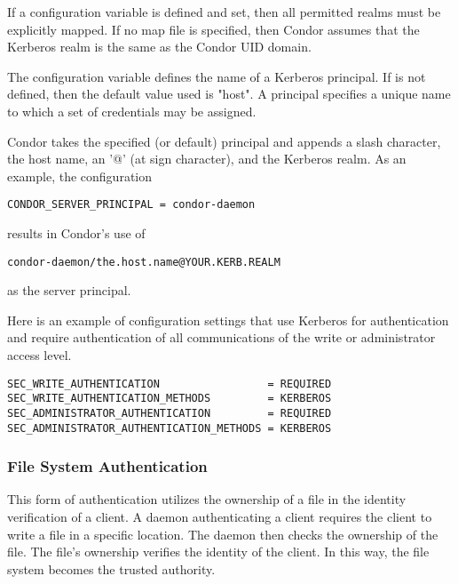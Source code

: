 If a 
configuration variable is defined and set,
then all permitted realms must be explicitly mapped.
If no map file is specified, then Condor assumes that the
Kerberos realm is the same as the Condor UID domain.

The configuration variable
defines the name of a Kerberos principal.
If  is not defined,
then the default value used is "host".
A principal specifies a unique name to which a set of credentials
may be assigned.

Condor takes the specified (or default) principal and appends
a slash character, the host name, an '@' (at sign character),
and the Kerberos realm.
As an example, the configuration
\begin{verbatim}
CONDOR_SERVER_PRINCIPAL = condor-daemon
\end{verbatim}
results in Condor's use of
\begin{verbatim}
condor-daemon/the.host.name@YOUR.KERB.REALM
\end{verbatim}
as the server principal.

Here is
an example of configuration settings that use Kerberos for
authentication and require authentication of all communications
of the write or administrator access level.
\footnotesize
\begin{verbatim}
SEC_WRITE_AUTHENTICATION                 = REQUIRED
SEC_WRITE_AUTHENTICATION_METHODS         = KERBEROS
SEC_ADMINISTRATOR_AUTHENTICATION         = REQUIRED
SEC_ADMINISTRATOR_AUTHENTICATION_METHODS = KERBEROS
\end{verbatim}
\normalsize

\subsubsection{\label{sec:FS-Authentication}File System Authentication}

This form of authentication utilizes the ownership of a file
in the identity verification of a client.
A daemon authenticating a client requires the client to write
a file in a specific location.
The daemon then checks the ownership of the file.
The file's ownership verifies the identity of the client.
In this way, the file system becomes the trusted authority.

